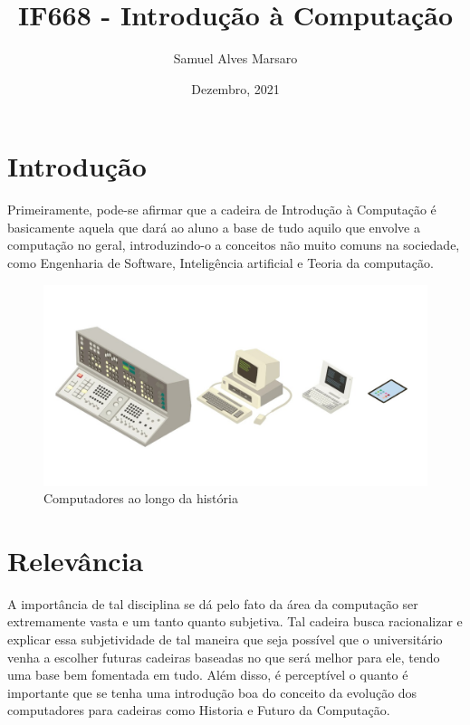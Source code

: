 \documentclass[a4paper, 12pt]{article}
\title{IF668 - Introdução à Computação}
\author{Samuel Alves Marsaro}
\date{Dezembro, 2021}
\begin{document}
\maketitle


\section{Introdução}
\par
Primeiramente, pode-se afirmar que a cadeira de Introdução à Computação é basicamente aquela que dará ao aluno a base de tudo aquilo que envolve a computação no geral, introduzindo-o a conceitos não muito comuns na sociedade, como Engenharia de Software, Inteligência artificial e Teoria da computação.\cite{sitecinIC}
\par
\begin{figure}[h]
    \centering
    \includegraphics[width=1\textwidth]{Imagens/computadores.jpeg}
    \caption{Computadores ao longo da história\cite{artigo_computadores}}
    \label{fig:computadores}
\end{figure}
    
    
\section{Relevância}
    \par
A importância de tal disciplina se dá pelo fato da área da computação ser extremamente vasta e um tanto quanto subjetiva. Tal cadeira busca racionalizar e explicar essa subjetividade de tal maneira que seja possível que o universitário venha a escolher futuras cadeiras baseadas no que será melhor para ele, tendo uma base bem fomentada em tudo. Além disso, é perceptível o quanto é importante que se tenha uma introdução boa do conceito da evolução dos computadores para cadeiras como Historia e Futuro da Computação.
\end{document}
